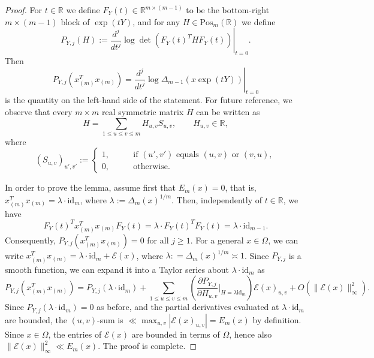 \documentclass[11pt,oneside]{amsart}
\numberwithin{equation}{section}
\theoremstyle{remark}
\theoremstyle{plain}
\newcommand\id{\mathrm{id}}
\newcommand\RR{\mathbb{R}}
\newcommand{\mcE}{\mathcal{E}}
\renewcommand\leq{\leqslant}
\renewcommand\geq{\geqslant}
\begin{document}
\begin{proof}
For $t \in \RR$ we define $F_Y(t) \in \RR^{m\times (m-1)}$ to be the bottom-right $m\times (m-1)$ block of $\exp(tY)$, and for any $H \in \text{Pos}_m(\RR)$ we define 
\[
P_{Y,j}(H):= \left.\frac{d^j}{dt^j} \log \det(F_Y(t)^T H F_Y(t))\right|_{t=0}.
\]
Then
\[
P_{Y,j}(x_{(m)}^T x_{(m)}) = \left.\frac{d^j}{dt^j} \log \Delta_{m-1}(x\exp(tY))\right|_{t=0}
\]
is the quantity on the left-hand side of the statement. For future reference, we observe that every $m\times m$ real symmetric matrix $H$ can be written as
\[
H=\sum_{1\leq u\leq v\leq m} H_{u,v} S_{u,v}, \qquad H_{u,v}\in\RR,
\]
where
\[
(S_{u,v})_{u',v'}:=\begin{cases}1,\qquad&\text{if $(u',v')$ equals $(u,v)$ or $(v,u)$},
\\ 0, &\text{otherwise}.
\end{cases}
\]

In order to prove the lemma, assume first that $E_{m}(x)=0$, that is, $x_{(m)}^T x_{(m)}=\lambda\cdot \id_m$, where $\lambda:=\Delta_m(x)^{1/m}$. Then, independently of $t\in\RR$, we have
\[
F_Y(t)^T x_{(m)}^T x_{(m)} F_Y(t) = \lambda\cdot F_Y(t)^T F_Y(t) = \lambda\cdot \id_{m-1}.
\]
Consequently, $P_{Y,j}(x_{(m)}^T x_{(m)})=0$ for all $j\geq 1$. For a general $x \in \Omega$, we can write $x_{(m)}^T x_{(m)} = \lambda \cdot \id_m + \mcE(x)$, where $\lambda: = \Delta_m(x)^{1/m}\asymp 1$. Since $P_{Y,j}$ is a smooth function, we can expand it into a Taylor series about $\lambda \cdot \id_m$ as
\[
P_{Y,j}(x_{(m)}^T x_{(m)}) = P_{Y,j}(\lambda \cdot \id_m) + \sum_{1\leq u\leq v\leq m} \left( \frac{\partial P_{Y,j}}{\partial H_{u,v}} \bigg|_{H = \lambda \id_m} \right) \mcE(x)_{u,v} + O(\|\mcE(x)\|_\infty^2).
\]
Since $P_{Y,j}(\lambda \cdot \id_m) = 0$ as before, and the partial derivatives evaluated at $\lambda \cdot \id_m$ are bounded, the $(u,v)$-sum is $\ll\max_{u,v} |\mcE(x)_{u,v}| = E_{m}(x)$ by definition. Since $x\in \Omega$, the entries of $\mcE(x)$ are bounded in terms of $\Omega$, hence also $\|\mcE(x)\|_\infty^2 \ll E_m(x)$. 
The proof is complete.
\end{proof}
\end{document}
